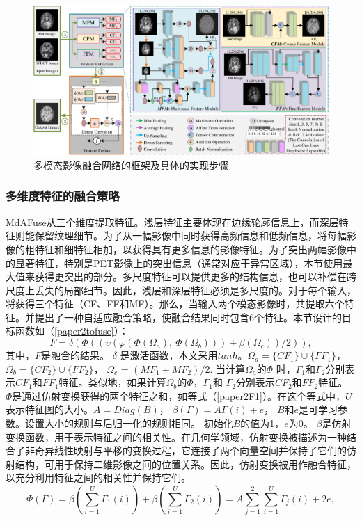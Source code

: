     \begin{figure}[htbp]
      \centering
      \includegraphics[width=0.9\linewidth]{figs/paper2framework.pdf}
      \caption{多模态影像融合网络的框架及具体的实现步骤}\label{paper2framework}
    \end{figure}
\subsubsection{多维度特征的融合策略}\label{chapter3.2:Fusion_strategy}
MdAFuse从三个维度提取特征。浅层特征主要体现在边缘轮廓信息上，而深层特征则能保留纹理细节。为了从一幅影像中同时获得高频信息和低频信息，将每幅影像的粗特征和细特征相加，以获得具有更多信息的影像特征。为了突出两幅影像中的显著特征，特别是PET影像上的突出信息（通常对应于异常区域），本节使用最大值来获得更突出的部分。多尺度特征可以提供更多的结构信息，也可以补偿在跨尺度上丢失的局部细节。因此，浅层和深层特征必须是多尺度的。对于每个输入，将获得三个特征（CF、FF和MF）。那么，当输入两个模态影像时，共提取六个特征。并提出了一种自适应融合策略，使融合结果同时包含6个特征。本节设计的目标函数如（\ref{paper2tofuse}）：
\begin{equation}\label{paper2tofuse}
   F=\delta(\Phi( (\upsilon (\varphi(\Phi(\Omega_a),~ \Phi(\Omega_b)) ) +\beta(\Omega_c))/2 )),
 \end{equation}
其中，$F$是融合的结果。 $\delta$ 是激活函数，本文采用$tanh$。$\Omega_a = \{ CF_1 \} \cup \{ FF_1 \}$， $\Omega_b = \{ CF_2 \} \cup \{ FF_2 \}$， $\Omega_c$ = $(MF_1+MF_2)/2$. 当计算$\Omega_a$的$\Phi$ 时，$\Gamma_1$和$\Gamma_2$分别表示$CF_1$和$FF_1$特征。类似地，如果计算$\Omega_b$的$\Phi$，$\Gamma_1$和 $\Gamma_2$分别表示$CF_2$和$FF_2$特征。
$\Phi$是通过仿射变换获得的两个特征之和，如等式（\ref{paper2F1}）。在这个等式中，$U$表示特征图的大小。$A=Diag(B)$， $\beta(\Gamma)= A\Gamma(i)+e$， $B$和$e$是可学习参数。设置大小的规则与后归一化的规则相同\cite{2021Going}。 初始化$B$的值为1，$e$为0。 $\beta$是仿射变换函数，用于表示特征之间的相关性。在几何学领域，仿射变换被描述为一种结合了非奇异线性映射与平移的变换过程，它连接了两个向量空间并保持了它们的仿射结构，可用于保持二维影像之间的位置关系。因此，仿射变换被用作融合特征，以充分利用特征之间的相关性并保持它们。
 \begin{equation}\label{paper2F1}
\Phi(\Gamma)=\beta(\sum_{i=1}^{U}\Gamma_1(i))+\beta(\sum_{i=1}^{U}\Gamma_2(i))=A\sum_{j=1}^{2}\sum_{i=1}^{U}\Gamma_j(i)+2e,
 \end{equation}

